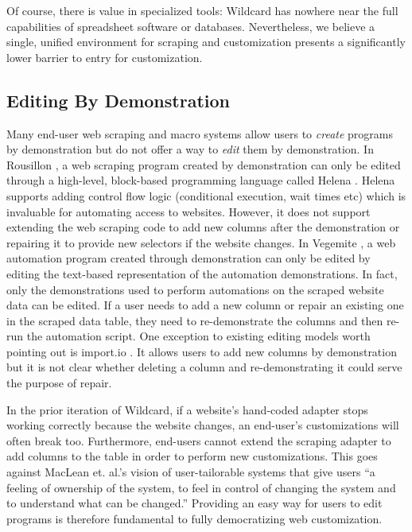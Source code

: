 \documentclass[sigconf,10pt]{acmart}
\begin{document}
Of course, there is value in specialized tools: Wildcard has nowhere
near the full capabilities of spreadsheet software or databases.
Nevertheless, we believe a single, unified environment for scraping and
customization presents a significantly lower barrier to entry for
customization.

\hypertarget{editing-by-demonstration-1}{%
\subsection{Editing By Demonstration}\label{editing-by-demonstration-1}}

Many end-user web scraping and macro systems allow users to
\emph{create} programs by demonstration but do not offer a way to
\emph{edit} them by demonstration. In Rousillon \citep{chasins2018}, a
web scraping program created by demonstration can only be edited through
a high-level, block-based programming language called Helena
\citep{zotero-1349}. Helena supports adding control flow logic
(conditional execution, wait times etc) which is invaluable for
automating access to websites. However, it does not support extending
the web scraping code to add new columns after the demonstration or
repairing it to provide new selectors if the website changes. In
Vegemite \citep{lin2009}, a web automation program created through
demonstration can only be edited by editing the text-based
representation of the automation demonstrations. In fact, only the
demonstrations used to perform automations on the scraped website data
can be edited. If a user needs to add a new column or repair an existing
one in the scraped data table, they need to re-demonstrate the columns
and then re-run the automation script. One exception to existing editing
models worth pointing out is import.io \citep{import.io}. It allows
users to add new columns by demonstration but it is not clear whether
deleting a column and re-demonstrating it could serve the purpose of
repair.

In the prior iteration of Wildcard, if a website's hand-coded adapter
stops working correctly because the website changes, an end-user's
customizations will often break too. Furthermore, end-users cannot
extend the scraping adapter to add columns to the table in order to
perform new customizations. This goes against MacLean et. al.'s vision
of user-tailorable systems \citep{maclean1990} that give users ``a
feeling of ownership of the system, to feel in control of changing the
system and to understand what can be changed.'' Providing an easy way
for users to edit programs is therefore fundamental to fully
democratizing web customization.
\end{document}
